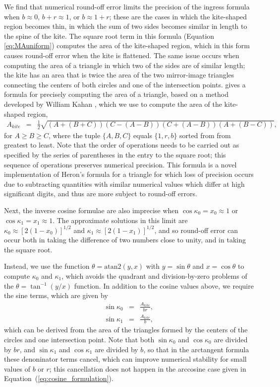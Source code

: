 \documentclass[modern,trackchanges]{aastex63}
\newcommand{\edited}{}
\begin{document}
We find that numerical round-off error limits the precision of the ingress formula when
$b \approx 0$, $b+r \approx 1$, or $b \approx 1+r$;  these are the cases in which
the kite-shaped region becomes thin, in which the sum of two sides becomes similar
in length to the spine of the kite.  The square root term in this formula (Equation
\ref{eq:MAuniform}) computes the area of the kite-shaped region, which in this
form causes round-off error when the kite is flattened.  The same issue occurs when
computing the area of a triangle in which two of the sides are of similar length;
the kite has an area that is twice the area of the {\edited two mirror-image triangles}
connecting the centers
of both circles and one of the intersection points.  \cite{Goldberg1991} gives a
formula for precisely computing the area of a triangle, based on a method developed
by William Kahan \citep[later described in][]{Kahan2000}, which we use to compute
the area of the kite-shaped region,
\begin{eqnarray}\label{eq:Kite_area}
A_{kite} &=& \frac{1}{2}\sqrt{(A+(B+C))(C-(A-B))(C+(A-B))(A+(B-C))},
\end{eqnarray}
for $A \ge B \ge C$, where the tuple $\{A,B,C\}$ equals $\{1,r,b\}$
sorted from from greatest to least.  Note that the order of operations
needs to be carried out as specified by the series of parentheses in
the entry to the square root;  this sequence of operations preserves
numerical precision. {\edited This formula is a novel implementation of Heron's
formula for a triangle for which loss of precision occurs due to subtracting 
quantities with similar numerical values which differ at high significant digits,
and thus are more subject to round-off errors.}

Next, the inverse cosine formulae are also imprecise when $\cos{\kappa_0} = x_0 \approx
1$ or $\cos{\kappa_1} = x_1 \approx 1$.  The approximate solutions in this limit
are $\kappa_0 \approx [2(1-x_0)]^{1/2}$ and $\kappa_1 \approx [2(1-x_1)]^{1/2}$, and so round-off
error can occur both in taking the difference of two numbers close to unity,
and in taking the square root.

Instead, we use the function $\theta = \mathrm{atan2}(y,x)$ with $y=\sin{\theta}$ and
$x=\cos{\theta}$ to compute $\kappa_0$ and $\kappa_1$, which avoids the quadrant and
division-by-zero problems of the $\theta = \tan^{-1}(y/x)$ function.  In addition
to the cosine values above, we require the sine terms, which are given by
\begin{eqnarray}
\sin{\kappa_0} &=& \frac{A_{kite}}{br},\nonumber\\
\sin{\kappa_1} &=& \frac{A_{kite}}{b},
\end{eqnarray}
which can be derived from the area of the triangles formed by the centers of
the circles and one intersection point.
Note that both $\sin{\kappa_0}$ and $\cos{\kappa_0}$ are divided by $br$, and
$\sin{\kappa_1}$ and $\cos{\kappa_1}$ are divided by $b$, so that
in the arctangent formula these denoninator terms cancel, which can improve
numerical stability for small values of $b$ or $r$; this cancellation does not happen
in the arccosine case given in Equation~(\ref{eq:cosine_formulation}).
\end{document}
